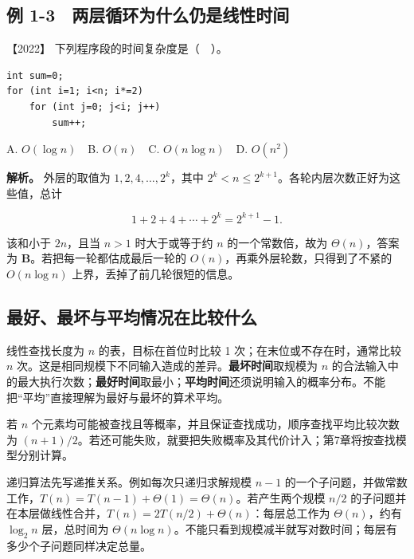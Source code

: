 \subsection{例 1-3　两层循环为什么仍是线性时间}\label{ds-ex1-3}

\noindent{}【2022】 下列程序段的时间复杂度是（　）。

\par\medskip\noindent
\begin{minipage}{\linewidth}
\begin{verbatim}
int sum=0;
for (int i=1; i<n; i*=2)
    for (int j=0; j<i; j++)
        sum++;
\end{verbatim}
\end{minipage}\par\medskip

A. \(O(\log n)\)　B. \(O(n)\)　C. \(O(n\log n)\)　D. \(O(n^2)\)


\textbf{解析。} 外层的取值为 \(1,2,4,\ldots,2^k\)，其中 \(2^k<n\le2^{k+1}\)。各轮内层次数正好为这些值，总计

\[1+2+4+\cdots+2^k=2^{k+1}-1.\]

该和小于 \(2n\)，且当 \(n>1\) 时大于或等于约 \(n\) 的一个常数倍，故为 \(\Theta(n)\)，答案为 \textbf{B}。若把每一轮都估成最后一轮的 \(O(n)\)，再乘外层轮数，只得到了不紧的 \(O(n\log n)\) 上界，丢掉了前几轮很短的信息。

\subsection{最好、最坏与平均情况在比较什么}\label{ds-c01-h92}

线性查找长度为 \(n\) 的表，目标在首位时比较 1 次；在末位或不存在时，通常比较 \(n\) 次。这是相同规模下不同输入造成的差异。\textbf{最坏时间}取规模为 \(n\) 的合法输入中的最大执行次数；\textbf{最好时间}取最小；\textbf{平均时间}还须说明输入的概率分布。不能把``平均''直接理解为最好与最坏的算术平均。

若 \(n\) 个元素均可能被查找且等概率，并且保证查找成功，顺序查找平均比较次数为 \((n+1)/2\)。若还可能失败，就要把失败概率及其代价计入；第7章将按查找模型分别计算。

递归算法先写递推关系。例如每次只递归求解规模 \(n-1\) 的一个子问题，并做常数工作，\(T(n)=T(n-1)+\Theta(1)=\Theta(n)\)。若产生两个规模 \(n/2\) 的子问题并在本层做线性合并，\(T(n)=2T(n/2)+\Theta(n)\)：每层总工作为 \(\Theta(n)\)，约有 \(\log_2n\) 层，总时间为 \(\Theta(n\log n)\)。不能只看到规模减半就写对数时间；每层有多少个子问题同样决定总量。

